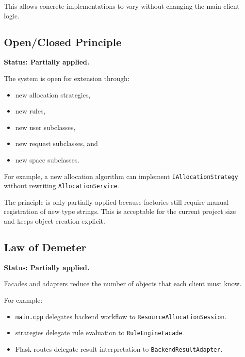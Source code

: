 \documentclass[12pt,a4paper]{article}
\begin{document}
This allows concrete implementations to vary without changing the main client
logic.

\subsection{Open/Closed Principle}

\textbf{Status: Partially applied.}

The system is open for extension through:

\begin{itemize}
    \item new allocation strategies,
    \item new rules,
    \item new user subclasses,
    \item new request subclasses, and
    \item new space subclasses.
\end{itemize}

For example, a new allocation algorithm can implement
\texttt{IAllocationStrategy} without rewriting \texttt{AllocationService}.

The principle is only partially applied because factories still require manual
registration of new type strings. This is acceptable for the current project
size and keeps object creation explicit.

\subsection{Law of Demeter}

\textbf{Status: Partially applied.}

Facades and adapters reduce the number of objects that each client must know.

For example:

\begin{itemize}
    \item \texttt{main.cpp} delegates backend workflow to
    \texttt{ResourceAllocationSession}.
    \item strategies delegate rule evaluation to \texttt{RuleEngineFacade}.
    \item Flask routes delegate result interpretation to
    \texttt{BackendResultAdapter}.
\end{itemize}
\end{document}
